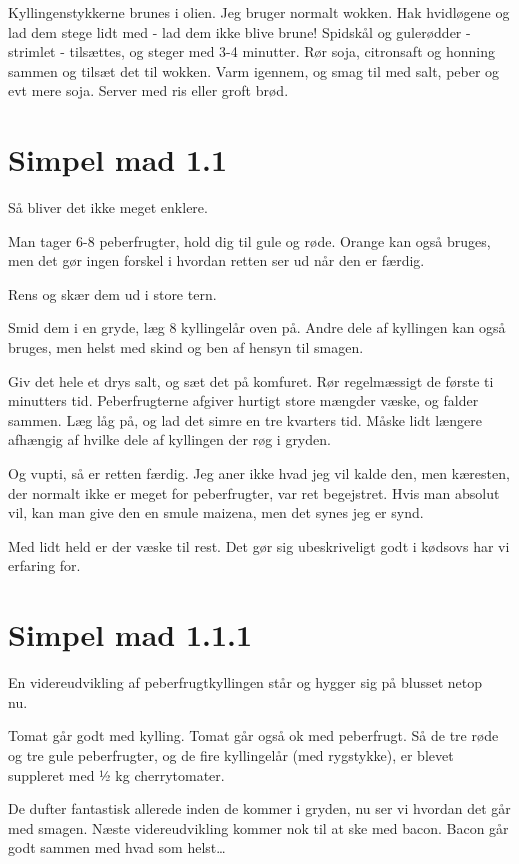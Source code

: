\documentclass[
]{book}
\begin{document}
Kyllingenstykkerne brunes i olien. Jeg bruger normalt wokken.
Hak hvidløgene og lad dem stege lidt med - lad dem ikke blive brune!
Spidskål og gulerødder - strimlet - tilsættes, og steger med 3-4 minutter.
Rør soja, citronsaft og honning sammen og tilsæt det til wokken.
Varm igennem, og smag til med salt, peber og evt mere soja.
Server med ris eller groft brød.

\hypertarget{simpel-mad-1.1}{%
\section{Simpel mad 1.1}\label{simpel-mad-1.1}}

Så bliver det ikke meget enklere.

Man tager 6-8 peberfrugter, hold dig til gule og røde. Orange kan også bruges, men det gør ingen forskel i hvordan retten ser ud når den er færdig.

Rens og skær dem ud i store tern.

Smid dem i en gryde, læg 8 kyllingelår oven på. Andre dele af kyllingen kan også bruges, men helst med skind og ben af hensyn til smagen.

Giv det hele et drys salt, og sæt det på komfuret. Rør regelmæssigt de første ti minutters tid. Peberfrugterne afgiver hurtigt store mængder væske, og falder sammen. Læg låg på, og lad det simre en tre kvarters tid. Måske lidt længere afhængig af hvilke dele af kyllingen der røg i gryden.

Og vupti, så er retten færdig. Jeg aner ikke hvad jeg vil kalde den, men kæresten, der normalt ikke er meget for peberfrugter, var ret begejstret. Hvis man absolut vil, kan man give den en smule maizena, men det synes jeg er synd.

Med lidt held er der væske til rest. Det gør sig ubeskriveligt godt i kødsovs har vi erfaring for.

\hypertarget{simpel-mad-1.1.1}{%
\section{Simpel mad 1.1.1}\label{simpel-mad-1.1.1}}

En videreudvikling af peberfrugtkyllingen står og hygger sig på blusset netop nu.~

Tomat går godt med kylling. Tomat går også ok med peberfrugt. Så de tre røde og tre gule peberfrugter, og de fire kyllingelår (med rygstykke), er blevet suppleret med ½ kg cherrytomater.

De dufter fantastisk allerede inden de kommer i gryden, nu ser vi hvordan det går med smagen. Næste videreudvikling kommer nok til at ske med bacon. Bacon går godt sammen med hvad som helst\ldots{}
\end{document}

